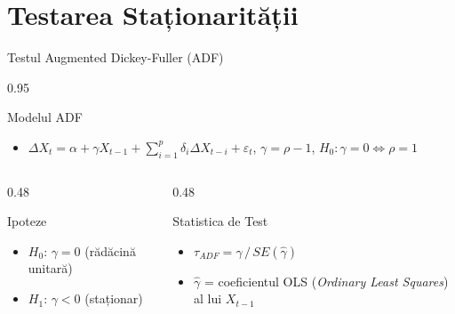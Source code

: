 \documentclass[9pt, aspectratio=169, t]{beamer}
\begin{document}
\section{Testarea Staționarității}

\begin{frame}{Testul Augmented Dickey-Fuller (ADF)}
    \begin{cminipage}{0.95\textwidth}
        \vspace{-0.3cm}
        {\footnotesize
        \begin{block}{Modelul ADF}
            \begin{itemize}\setlength{\itemsep}{0pt}
                \item $\Delta X_t = \alpha + \gamma X_{t-1} + \sum_{i=1}^{p} \delta_i \Delta X_{t-i} + \varepsilon_t$, \;\;
                $\gamma = \rho - 1$, \; $H_0: \gamma = 0 \Leftrightarrow \rho = 1$
            \end{itemize}
        \end{block}
        \vspace{-2mm}
        \begin{columns}[T]
            \begin{column}{0.48\textwidth}
                \begin{exampleblock}{Ipoteze}
                    \begin{itemize}\setlength{\itemsep}{0pt}
                        \item \textbf{$H_0$}: $\gamma = 0$ (rădăcină unitară)
                        \item \textbf{$H_1$}: $\gamma < 0$ (staționar)
                    \end{itemize}
                \end{exampleblock}
            \end{column}
            \begin{column}{0.48\textwidth}
                \begin{block}{Statistica de Test}
                    \begin{itemize}\setlength{\itemsep}{0pt}
                        \item $\tau_{ADF} = \hat{\gamma}\, / \, SE(\hat{\gamma})$
                        \item $\hat{\gamma}$ = coeficientul OLS (\textit{Ordinary Least Squares}) al lui $X_{t-1}$

\end{itemize}
\end{block}
\end{column}
\end{columns}}
\end{cminipage}
\end{frame}
\end{document}
